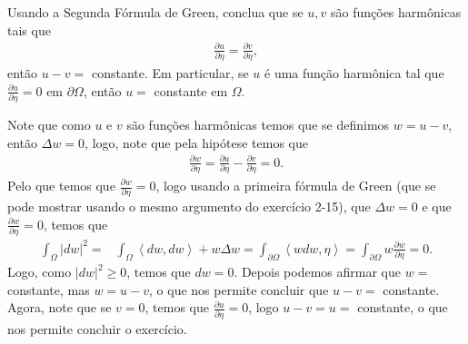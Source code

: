 \begin{homeworkProblem}[Seção 2-16]
  Usando a Segunda Fórmula de Green, conclua que se $u,v$ são funções harmônicas tais que
  \begin{align*}
    \frac{\partial u}{\partial\eta}=\frac{\partial v}{\partial\eta},    
  \end{align*}
  então $u-v=$ constante.
  Em particular, se $u$ é uma função harmônica tal que $\frac{\partial u}{\partial\eta}=0$ em $\partial\Omega$, então $u=$ constante em $\Omega$.
  \begin{solution}
    Note que como $u$ e $v$ são funções harmônicas temos que se definimos $w=u-v$, então $\Delta w=0$, logo, note que pela hipótese temos que
    \begin{align*}
      \frac{\partial w}{\partial \eta}=\frac{\partial u}{\partial \eta}-\frac{\partial v}{\partial \eta}=0.
    \end{align*}
    Pelo que temos que $\frac{\partial w}{\partial \eta}=0$, logo usando a primeira fórmula de Green (que se pode mostrar usando o mesmo  argumento do exercício 2-15), que $\Delta w=0$ e que $\frac{\partial w}{\partial \eta}=0$, temos que
    \begin{align*}
      \int_{\Omega}\left| dw \right|^{2}=&\int_{\Omega}\left\langle dw,dw \right\rangle+w\Delta w
      =\int_{\partial\Omega}\left\langle wdw,\eta \right\rangle
      =\int_{\partial\Omega}w\frac{\partial w}{\partial \eta}
      =0.
    \end{align*}
    Logo, como $\left| dw \right|^{2}\geq 0$, temos que $dw=0$. Depois podemos afirmar que $w=$ constante, mas $w=u-v$, o que nos permite concluir que $u-v=$ constante.\\
    Agora, note que se $v=0$, temos que $\frac{\partial u}{\partial \eta}=0$, logo $u-v=u=$ constante, o que nos permite concluir o exercício. 
  \end{solution}
\end{homeworkProblem}
